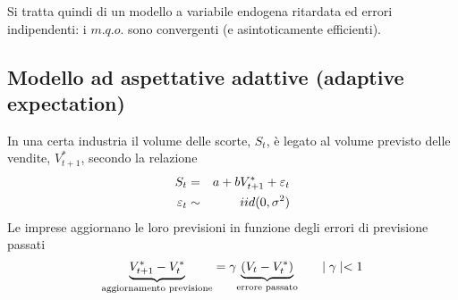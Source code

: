 \documentclass[a4paper]{report}
\newcounter{ese}
\theoremstyle{remark}
\begin{document}
\noindent Si tratta quindi di un modello a variabile endogena ritardata ed
errori indipendenti: i $m.q.o.$ sono convergenti (e asintoticamente
efficienti).

\subsection{Modello ad aspettative adattive (adaptive expectation)}

In una certa industria il volume delle scorte, $S_{t}$, \`{e} legato al
volume previsto delle vendite, $V_{t+1}^{\ast }$, secondo la relazione%
\begin{eqnarray}
S_{t} &=&a+bV_{t+1}^{\ast }+\varepsilon _{t}
\label{scorte aspettative adattive} \\
\varepsilon _{t} &\sim &iid(0,\sigma ^{2})  \notag
\end{eqnarray}%
Le imprese aggiornano le loro previsioni in funzione degli errori di
previsione passati%
\begin{equation}
\underset{\text{aggiornamento previsione}}{\underbrace{V_{t+1}^{\ast
}-V_{t}^{\ast }}}=\gamma \underset{\text{errore passato}}{\underbrace{%
(V_{t}-V_{t}^{\ast })}}\ \ \ \ \ \mid \gamma \mid <1
\label{aggiornamento previsione}
\end{equation}
\end{document}
